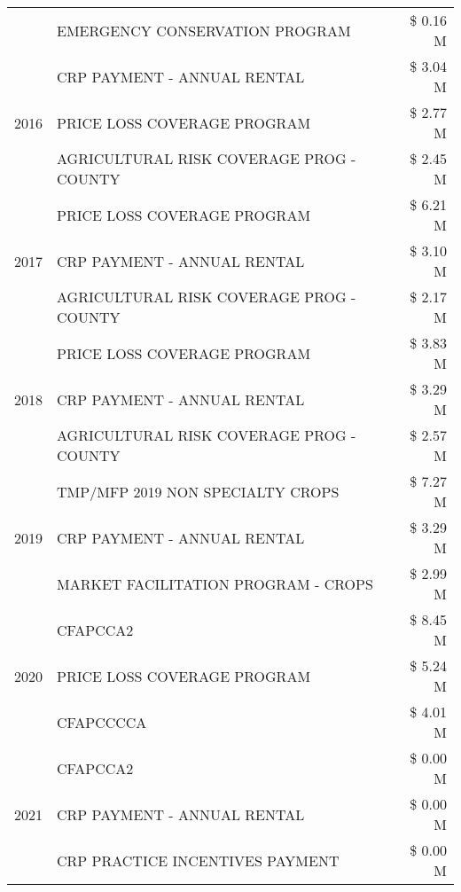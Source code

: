 \begin{tabular}{llr}
 & EMERGENCY CONSERVATION PROGRAM & \$ 0.16 M \\
\cline{1-3}
\multirow[t]{3}{*}{2016} & CRP PAYMENT - ANNUAL RENTAL & \$ 3.04 M \\
 & PRICE LOSS COVERAGE PROGRAM & \$ 2.77 M \\
 & AGRICULTURAL RISK COVERAGE PROG - COUNTY & \$ 2.45 M \\
\cline{1-3}
\multirow[t]{3}{*}{2017} & PRICE LOSS COVERAGE PROGRAM & \$ 6.21 M \\
 & CRP PAYMENT - ANNUAL RENTAL & \$ 3.10 M \\
 & AGRICULTURAL RISK COVERAGE PROG - COUNTY & \$ 2.17 M \\
\cline{1-3}
\multirow[t]{3}{*}{2018} & PRICE LOSS COVERAGE PROGRAM & \$ 3.83 M \\
 & CRP PAYMENT - ANNUAL RENTAL & \$ 3.29 M \\
 & AGRICULTURAL RISK COVERAGE PROG - COUNTY & \$ 2.57 M \\
\cline{1-3}
\multirow[t]{3}{*}{2019} & TMP/MFP 2019 NON SPECIALTY CROPS & \$ 7.27 M \\
 & CRP PAYMENT - ANNUAL RENTAL & \$ 3.29 M \\
 & MARKET FACILITATION PROGRAM - CROPS & \$ 2.99 M \\
\cline{1-3}
\multirow[t]{3}{*}{2020} & CFAPCCA2 & \$ 8.45 M \\
 & PRICE LOSS COVERAGE PROGRAM & \$ 5.24 M \\
 & CFAPCCCCA & \$ 4.01 M \\
\cline{1-3}
\multirow[t]{3}{*}{2021} & CFAPCCA2 & \$ 0.00 M \\
 & CRP PAYMENT - ANNUAL RENTAL & \$ 0.00 M \\
 & CRP PRACTICE INCENTIVES PAYMENT & \$ 0.00 M \\
\cline{1-3}
\bottomrule
\end{tabular}
